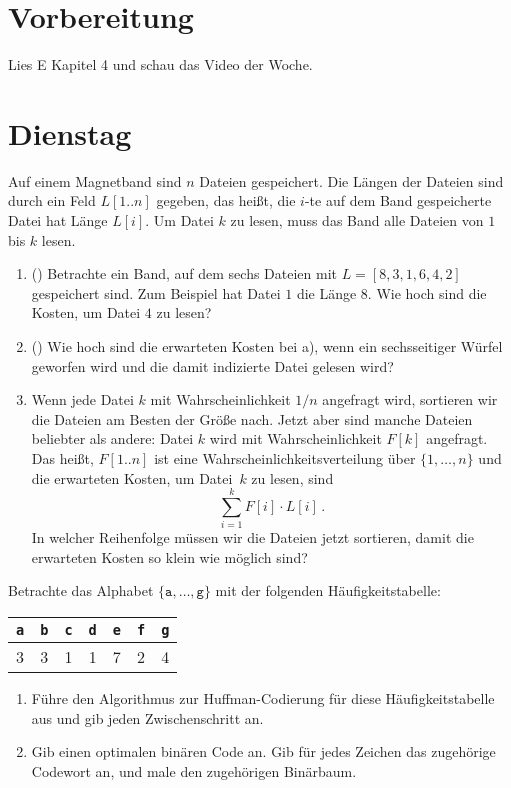 \documentclass{uebung_cs}
\begin{document}
\section*{Vorbereitung}
Lies E Kapitel 4 und schau das Video der Woche.

\section*{Dienstag}
\begin{aufgabe}
    Auf einem Magnetband sind $n$ Dateien gespeichert.
    Die Längen der Dateien sind durch ein Feld $L[1..n]$ gegeben, das heißt, die $i$-te auf dem Band gespeicherte Datei hat Länge $L[i]$.
    Um Datei $k$ zu lesen, muss das Band alle Dateien von $1$ bis $k$ lesen.
    \begin{enumerate}
        \item(\warmup) Betrachte ein Band, auf dem sechs Dateien mit $L=[8,3,1,6,4,2]$ gespeichert sind. Zum Beispiel hat Datei $1$ die Länge $8$.
        Wie hoch sind die Kosten, um Datei $4$ zu lesen?
        \item(\warmup) Wie hoch sind die erwarteten Kosten bei a), wenn ein sechsseitiger Würfel geworfen wird und die damit indizierte Datei gelesen wird?
        \item Wenn jede Datei $k$ mit Wahrscheinlichkeit $1/n$ angefragt wird, sortieren wir die Dateien am Besten der Größe nach. Jetzt aber sind manche Dateien beliebter als andere: Datei $k$ wird mit Wahrscheinlichkeit $F[k]$ angefragt. Das heißt, $F[1..n]$ ist eine Wahrscheinlichkeitsverteilung über $\{1,\dots,n\}$ und die erwarteten Kosten, um Datei~$k$ zu lesen, sind
        \[\sum_{i=1}^k F[i]\cdot L[i]\,.\]
        In welcher Reihenfolge müssen wir die Dateien jetzt sortieren, damit die erwarteten Kosten so klein wie möglich sind?
    \end{enumerate}
\end{aufgabe}

\begin{aufgabe}
    Betrachte das Alphabet $\{\texttt a,\dots,\texttt g\}$ mit der folgenden Häufigkeitstabelle:
	\begin{center}
		\begin{tabular}{ccccccc}
			\texttt{a}&\texttt{b}&\texttt{c}&\texttt{d}&\texttt{e}&\texttt{f}&\texttt{g}\\\hline
			3&3&1&1&7&2&4\\
		\end{tabular}
	\end{center}
    \begin{enumerate}
        \item Führe den Algorithmus zur Huffman-Codierung für diese Häufigkeitstabelle aus und gib jeden Zwischenschritt an.
        \item Gib einen optimalen binären Code an. Gib für jedes Zeichen das zugehörige Codewort an, und male den zugehörigen Binärbaum.
    \end{enumerate}
\end{aufgabe}
\end{document}
